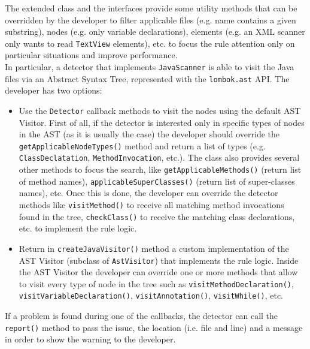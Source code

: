 \documentclass[11pt,a4paper,notitlepage]{article}
\begin{document}
The extended class and the interfaces provide some utility methods that can be overridden by the developer to filter applicable files (e.g. name contains a given substring), nodes (e.g. only variable declarations), elements (e.g. an XML scanner only wants to read \texttt{TextView} elements), etc. to focus the rule attention only on particular situations and improve performance.\\
In particular, a detector that implements \texttt{JavaScanner} is able to visit the Java files via an Abstract Syntax Tree, represented with the \texttt{lombok.ast} API. The developer has two options:
\begin{itemize}
	\item Use the \texttt{Detector} callback methods to visit the nodes using the default AST Visitor. First of all, if the detector is interested only in specific types of nodes in the AST (as it is usually the case) the developer should override the \texttt{getApplicableNodeTypes()} method and return a list of types (e.g. \texttt{ClassDeclatation}, \texttt{MethodInvocation}, etc.). The class also provides several other methods to focus the search, like \texttt{getApplicableMethods()} (return list of method names), \texttt{applicableSuperClasses()} (return list of super-classes names), etc. Once this is done, the developer can override the detector methods like \texttt{visitMethod()} to receive all matching method invocations found in the tree, \texttt{checkClass()} to receive the matching class declarations, etc. to implement the rule logic.
	\item Return in \texttt{createJavaVisitor()} method a custom implementation of the AST Visitor (subclass of \texttt{AstVisitor}) that implements the rule logic. Inside the AST Visitor the developer can override one or more methods that allow to visit every type of node in the tree such as \texttt{visitMethodDeclaration()}, \texttt{visitVariableDeclaration()}, \texttt{visitAnnotation()}, \texttt{visitWhile()}, etc. 
\end{itemize}
If a problem is found during one of the callbacks, the detector can call the \texttt{report()} method to pass the issue, the location (i.e. file and line) and a message in order to show the warning to the developer.\smallskip \\
\end{document}
